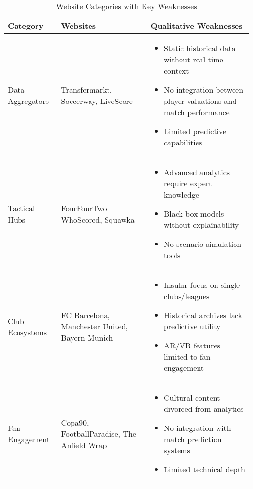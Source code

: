 \begin{table}[h!]
    \centering
    \caption{Website Categories with Key Weaknesses}
    \label{tab:category-weaknesses}
    \scriptsize
    \begin{tabularx}{\textwidth}{|l|X|X|}
        \hline
        \textbf{Category} & \textbf{Websites} & \textbf{Qualitative Weaknesses} \\
        \hline
        Data Aggregators & Transfermarkt, Soccerway, LiveScore & 
        \begin{itemize}
            \item Static historical data without real-time context
            \item No integration between player valuations and match performance
            \item Limited predictive capabilities
        \end{itemize} \\
        \hline
        Tactical Hubs & FourFourTwo, WhoScored, Squawka & 
        \begin{itemize}
            \item Advanced analytics require expert knowledge
            \item Black-box models without explainability
            \item No scenario simulation tools
        \end{itemize} \\
        \hline
        Club Ecosystems & FC Barcelona, Manchester United, Bayern Munich & 
        \begin{itemize}
            \item Insular focus on single clubs/leagues
            \item Historical archives lack predictive utility
            \item AR/VR features limited to fan engagement
        \end{itemize} \\
        \hline
        Fan Engagement & Copa90, FootballParadise, The Anfield Wrap & 
        \begin{itemize}
            \item Cultural content divorced from analytics
            \item No integration with match prediction systems
            \item Limited technical depth
        \end{itemize} \\
        \hline

\end{tabularx}
\end{table}
